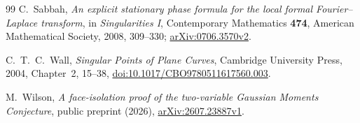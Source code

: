 \documentclass[11pt]{article}
\theoremstyle{definition}\newtheorem{definition}[theorem]{Definition}
\theoremstyle{remark}\newtheorem{remark}[theorem]{Remark}
\begin{document}
\begin{thebibliography}{99}
C.~Sabbah, \emph{An explicit stationary phase formula for the local
formal Fourier--Laplace transform}, in \emph{Singularities I},
Contemporary Mathematics \textbf{474}, American Mathematical Society,
2008, 309--330;
\href{https://arxiv.org/abs/0706.3570v2}{arXiv:0706.3570v2}.

C.~T.~C.~Wall, \emph{Singular Points of Plane Curves}, Cambridge
University Press, 2004, Chapter~2, 15--38,
\href{https://doi.org/10.1017/CBO9780511617560.003}{doi:10.1017/CBO9780511617560.003}.

M.~Wilson, \emph{A face-isolation proof of the two-variable Gaussian
Moments Conjecture}, public preprint (2026),
\href{https://arxiv.org/abs/2607.23887v1}{arXiv:2607.23887v1}.
\end{thebibliography}
\end{document}
